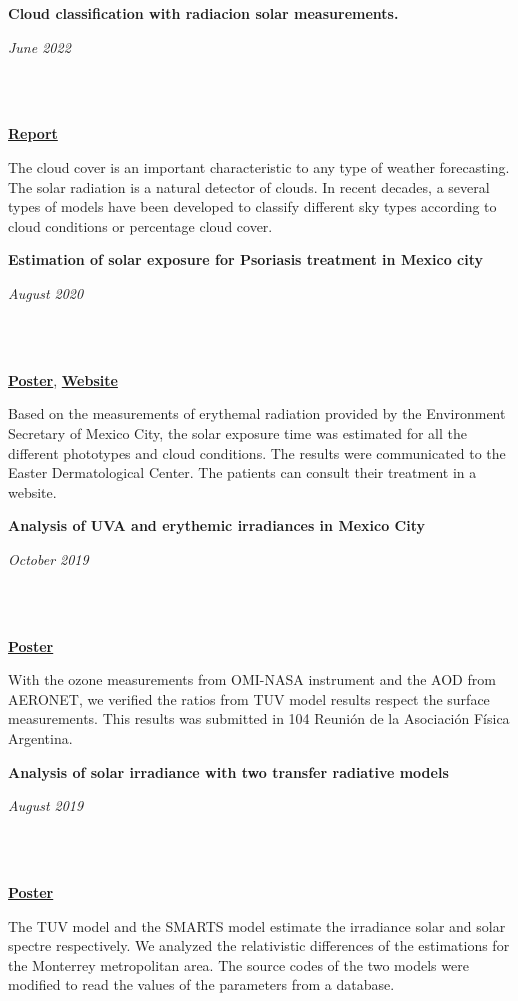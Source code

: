 \documentclass[a3paper]{adcv_color}
\newcommand{\proyect}[3]{\begin{minipage}{1\linewidth}
    \begin{minipage}{0.8\linewidth}
      \textbf{#1}
    \end{minipage}
    \begin{minipage}{0.19\linewidth}
      \begin{flushright}
        \vspace{#3cm}
        \textit{#2}
      \end{flushright}
    \end{minipage}\\
  \end{minipage}
  \vspace{0.1cm}\\
}
\begin{document}
\begin{multicols}{2}
  \proyect{Cloud classification with radiacion solar measurements.}{June 2022}{0}
  \href{https://github.com/giovannilopez9808/Cloud_classification/raw/main/Document/Main.pdf}{\textbf{Report}}

  The cloud cover is an important characteristic to any type of weather forecasting. The solar radiation is a natural detector of clouds. In recent decades, a several types of models have been developed to classify different sky types according to cloud conditions or percentage cloud cover.

  \columnbreak

  \proyect{Estimation of solar exposure for Psoriasis treatment in Mexico city}{August 2020}{-0.2}
  \href{https://github.com/giovannilopez9808/Documents/raw/master/Posters/2020/CNF/TES/main.pdf}{\textbf{Poster}}, \href{http://tes-v1.herokuapp.com/}{\textbf{Website}}

  Based on the measurements of erythemal radiation provided by the Environment Secretary of Mexico City, the solar exposure time was estimated for all the different phototypes and cloud conditions. The results were communicated to the Easter Dermatological Center. The patients can consult their treatment in a website.\\

  \proyect{\textbf{Analysis of UVA and erythemic irradiances in Mexico City}}{October 2019}{-0.2}  \href{https://github.com/giovannilopez9808/Documents/raw/master/Posters/2019/AFA/Analisis%20indice%20UV/Analisis%20de%20irradiancia.pdf}{\textbf{Poster}}

    With the ozone measurements from OMI-NASA instrument and the AOD from AERONET, we verified the ratios from TUV model results respect the surface measurements. This results was submitted in 104 Reunión de la Asociación Física Argentina.\\

    \proyect{Analysis of solar irradiance with two transfer radiative models}{August 2019}{0}
    \href{https://github.com/giovannilopez9808/Documents/raw/master/Posters/2019/CNF/Transferencia%20radiativa/main.pdf}{\textbf{Poster}}

      The TUV model and the SMARTS model estimate the irradiance solar and solar spectre respectively. We analyzed the relativistic differences of the estimations for the Monterrey metropolitan area. The source codes of the two models were modified to read the values of the parameters from a database.\\



\end{multicols}
\end{document}
